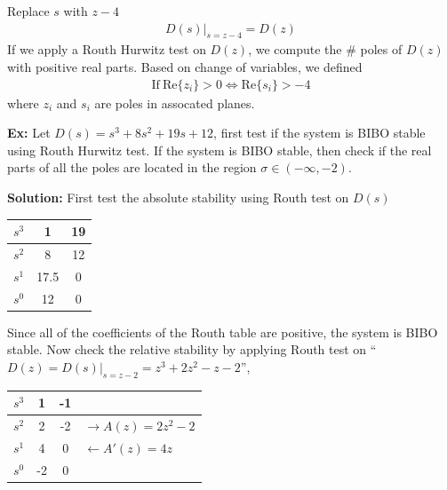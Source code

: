 \documentclass[twoside]{article}
\begin{document}
Replace $s$ with $z - 4$
%
\begin{align*}
  D(s)|_{s = z- 4} = D(z)
\end{align*}
%
If we apply a Routh Hurwitz test on $D(z)$, we compute the $\#$
poles of $D(z)$ with positive real parts. Based on change of
variables, we defined 
%
\begin{align*}
\mathrm{If} \ \mathrm{Re} \lbrace z_i \rbrace > 0 \Leftrightarrow
\mathrm{Re} \lbrace s_i \rbrace > -4
\end{align*}
%
where $z_i$ and $s_i$ are poles in assocated planes. 

\vspace{12pt}

\textbf{Ex:} Let $D(s) = s^3 + 8 s^2 + 19 s + 12$, first test if the
system is BIBO stable using Routh Hurwitz test. If the system is BIBO 
stable, then check if the real parts of all the poles are located in the
region $\sigma \in (-\infty , -2)$.

\textbf{Solution:} First test the absolute stability using Routh test
on $D(s)$

\vspace{6pt}
\begin{minipage}[h]{1\linewidth}
\begin{center}
\begin{tabular}{|c || c || c  |}
\hline
$s^3$ & 1 & 19
\\ \hline
$s^2$ & 8 & 12
\\ \hline
$s^1$ & 17.5 & 0 
\\ \hline
$s^0$ & 12 & 0  
\\ \hline
\end{tabular}
\end{center}
\end{minipage}
\vspace{6pt}

Since all of the coefficients of the Routh table are positive, the
system is BIBO stable. Now check the relative stability by applying
Routh test on  ``$D(z) = D(s)|_{s = z - 2} =  z^3 + 2 z^2 - z - 2$'',

\vspace{6pt}
\begin{minipage}[h]{1\linewidth}
\begin{center}
\begin{tabular}{|c || c || c | l |}
\hline
$s^3$ & 1 & -1 & 
\\ \hline
$s^2$ & 2 & -2 & $\rightarrow A(z) = 2 z^2 - 2$
\\ \hline
$s^1$ & 4 & 0 & $\leftarrow A'(z) = 4 z $
\\ \hline
$s^0$ & -2 & 0 &
\\ \hline
\end{tabular}
\end{center}
\end{minipage}
\vspace{6pt}
\end{document}
